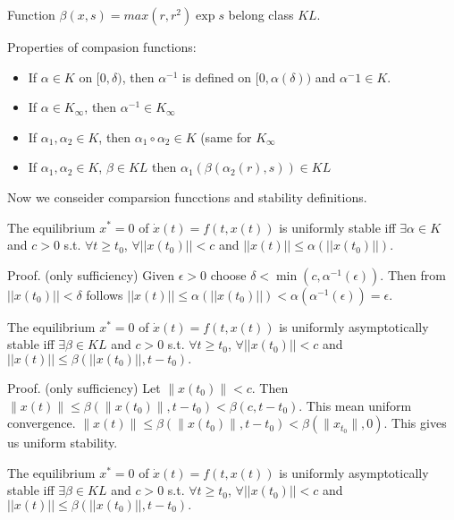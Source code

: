  Function $\beta(x,s)=max(r,r^2)\exp{s}$ belong class $KL$.

Properties of compasion functions:

\begin{itemize}
 \item If $\alpha \in K$ on $[0, \delta)$, then $\alpha^{-1}$ is defined on 
 $[0, \alpha(\delta))$ and $\alpha^-1 \in K$.
 \item If $\alpha \in K_\infty$, then $\alpha^{-1}\in K_\infty$
 \item If $\alpha_1,\alpha_2\in K$, then $\alpha_1 \circ \alpha_2\in K$
  (same for $K_\infty$
 \item If $\alpha_1,\alpha_2\in K$, $\beta\in KL $ then 
  $\alpha_1(\beta(\alpha_2(r),s)) \in KL$
\end{itemize}

Now we conseider comparsion funcctions and stability definitions.

 The equilibrium $x^*=0$ of $\dot x(t)=f(t,x(t))$ is uniformly stable iff
 $\exists \alpha\in K$ and $c>0$ s.t.  $\forall t \ge t_0$,
 $\forall ||x(t_0)||<c$ and $||x(t)|| \le \alpha(||x(t_0)||).$ 

 Proof. (only sufficiency) Given $\epsilon>0$ choose 
 $\delta<\min(c, \alpha^{-1}(\epsilon))$. Then from $||x(t_0)||<\delta$
 follows $||x(t)||\le\alpha(||x(t_0)||)<\alpha(\alpha^{-1}(\epsilon))=\epsilon$.


 The equilibrium $x^*=0$ of $\dot x(t)=f(t,x(t))$ is uniformly asymptotically stable iff
 $\exists \beta\in KL$ and $c>0$ s.t. $\forall t \ge t_0$,
 $\forall ||x(t_0)||<c$ and $||x(t)|| \le \beta(||x(t_0)||, t-t_0).$ 

 Proof. (only sufficiency) Let $\|x(t_0)\|<c$. Then 
 $\|x(t)\| \le \beta(\|x(t_0)\|, t-t_0) < \beta(c,t-t_0)$. This mean uniform convergence.
 $\|x(t)\| \le \beta(\|x(t_0)\|, t-t_0)<\beta(\|x_{t_0}\|, 0)$. This gives us uniform
 stability.


 The equilibrium $x^*=0$ of $\dot x(t)=f(t,x(t))$ is uniformly asymptotically stable iff
 $\exists \beta\in KL$ and $c>0$ s.t. $\forall t \ge t_0$,
 $\forall ||x(t_0)||<c$ and $||x(t)|| \le \beta(||x(t_0)||, t-t_0).$ 

